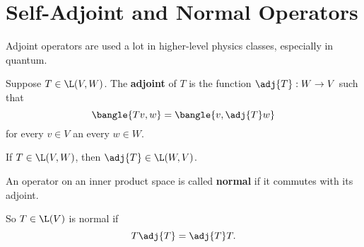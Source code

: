 \section{Self-Adjoint and Normal Operators}

Adjoint operators are used a lot in higher-level physics classes, especially in quantum.

\begin{definition}
  Suppose $T \in \L(V, W)$. The \textbf{adjoint} of $T$ is the function $\adj{T}:W\to V$ such that
  \begin{equation}
    \bangle{
      Tv, w
    } = \bangle{
      v, \adj{T}w
    }
  \end{equation}
  for every $v\in V$ an every $w \in W$.
\end{definition}

\begin{theorem}
  If $T \in \L(V, W)$, then $\adj{T} \in \L(W, V)$.
\end{theorem}

\begin{definition}
  An operator on an inner product space is called \textbf{normal} if it commutes with its adjoint.

  So $T \in \L(V)$ is normal if
  \begin{equation}
    T\adj{T} = \adj{T}T.
  \end{equation}
\end{definition}



